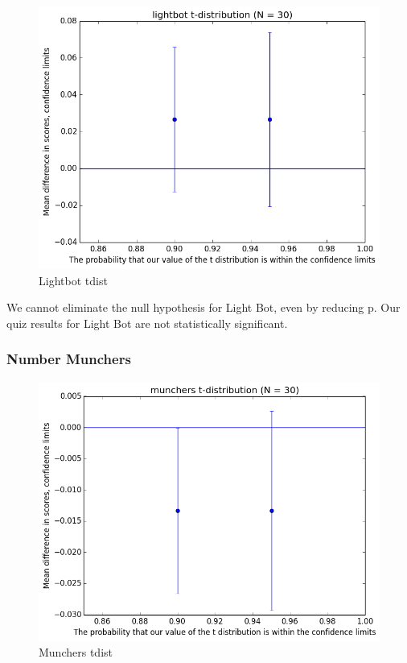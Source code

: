 				\begin{figure}[] 
					\centering 
					\includegraphics[width=\textwidth, height=.4\textheight, keepaspectratio=true]{lightbot_tdist.png} 
					\caption{Lightbot tdist}
				\end{figure}

				We cannot eliminate the null hypothesis for Light Bot, even by reducing p. Our quiz results for Light Bot are not statistically significant.

			\subsubsection{Number Munchers}

				\begin{figure}[] 
					\centering 
					\includegraphics[width=\textwidth, height=.4\textheight, keepaspectratio=true]{munchers_tdist.png} 
					\caption{Munchers tdist}
				\end{figure}

